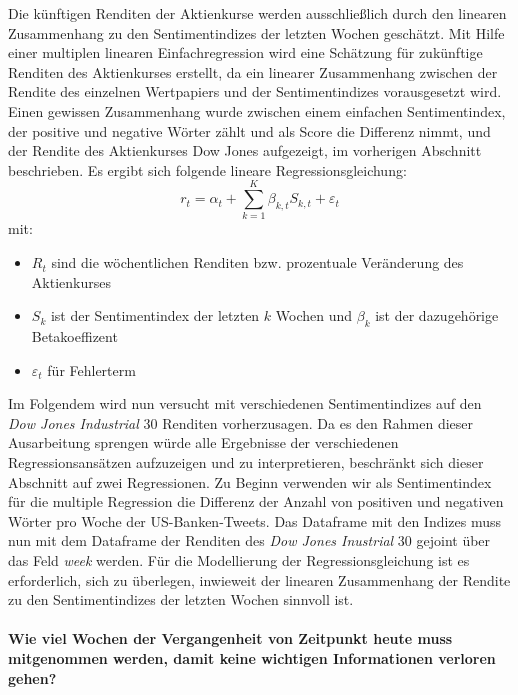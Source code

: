 Die künftigen Renditen der Aktienkurse werden ausschließlich
durch den linearen Zusammenhang zu den Sentimentindizes der letzten Wochen geschätzt. Mit Hilfe einer multiplen linearen Einfachregression wird eine Schätzung für zukünftige Renditen des Aktienkurses erstellt, da ein linearer Zusammenhang zwischen der Rendite des einzelnen Wertpapiers und der Sentimentindizes vorausgesetzt wird. Einen gewissen Zusammenhang wurde zwischen einem einfachen Sentimentindex, der positive und negative Wörter zählt und als Score die Differenz nimmt, und der Rendite des Aktienkurses  Dow Jones aufgezeigt, im  vorherigen Abschnitt beschrieben. Es ergibt sich folgende lineare Regressionsgleichung:
\begin{equation}
r_{t}=\alpha_{t}+ \sum_{k=1}^{K} \beta_{k,t} S_{k,t}+\varepsilon_{t}
\end{equation}
mit:
\begin{itemize}
	\item  $R_{t}$ sind die wöchentlichen Renditen bzw. prozentuale Veränderung des Aktienkurses
	\item $S_{k}$ ist der Sentimentindex der letzten $k$ Wochen und $\beta_{k}$ ist der dazugehörige Betakoeffizent
	\item $\varepsilon_{t}$ für  Fehlerterm 
\end{itemize}
Im Folgendem wird nun versucht mit verschiedenen Sentimentindizes auf den \textit{Dow Jones Industrial} $30$ Renditen vorherzusagen. Da es den Rahmen dieser Ausarbeitung sprengen würde alle Ergebnisse der verschiedenen Regressionsansätzen aufzuzeigen und zu interpretieren, beschränkt sich dieser Abschnitt auf zwei Regressionen. Zu Beginn verwenden wir als Sentimentindex für die multiple Regression die Differenz der Anzahl von positiven und negativen Wörter pro Woche der US-Banken-Tweets. Das Dataframe mit den Indizes muss nun mit dem Dataframe der Renditen  des \textit{Dow Jones Inustrial} $30$ gejoint  über das Feld \textit{week} werden. Für die Modellierung der Regressionsgleichung ist es erforderlich, sich zu überlegen, inwieweit der linearen Zusammenhang der Rendite zu den Sentimentindizes der letzten Wochen sinnvoll ist.\\
\\
\textbf{Wie viel Wochen der Vergangenheit von Zeitpunkt heute muss mitgenommen werden, damit keine wichtigen Informationen verloren gehen?} 
\\
\\
